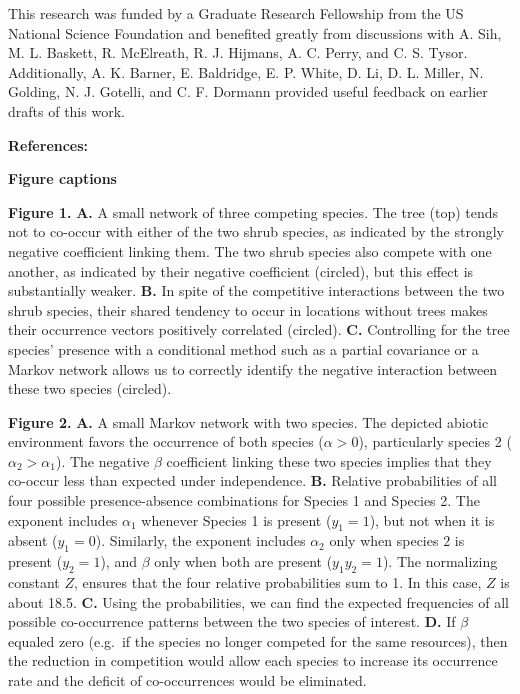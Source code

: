 \documentclass[12pt,]{article}
\begin{document}
\begin{spacing}{1.9}
\begin{flushleft}
This research was funded by a Graduate Research Fellowship from the US
National Science Foundation and benefited greatly from discussions with
A. Sih, M. L. Baskett, R. McElreath, R. J. Hijmans, A. C. Perry, and C.
S. Tysor. Additionally, A. K. Barner, E. Baldridge, E. P. White, D. Li,
D. L. Miller, N. Golding, N. J. Gotelli, and C. F. Dormann provided
useful feedback on earlier drafts of this work.

\setlength{\parindent}{0cm} \setlength{\parskip}{4pt}

\textbf{References:}

\textbf{Figure captions}

\textbf{Figure 1.} \textbf{A.} A small network of three competing
species. The tree (top) tends not to co-occur with either of the two
shrub species, as indicated by the strongly negative coefficient linking
them. The two shrub species also compete with one another, as indicated
by their negative coefficient (circled), but this effect is
substantially weaker. \textbf{B.} In spite of the competitive
interactions between the two shrub species, their shared tendency to
occur in locations without trees makes their occurrence vectors
positively correlated (circled). \textbf{C.} Controlling for the tree
species' presence with a conditional method such as a partial covariance
or a Markov network allows us to correctly identify the negative
interaction between these two species (circled).

\textbf{Figure 2.} \textbf{A.} A small Markov network with two species.
The depicted abiotic environment favors the occurrence of both species
(\(\alpha >0\)), particularly species 2 (\(\alpha_2 > \alpha_1\)). The
negative \(\beta\) coefficient linking these two species implies that
they co-occur less than expected under independence. \textbf{B.}
Relative probabilities of all four possible presence-absence
combinations for Species 1 and Species 2. The exponent includes
\(\alpha_1\) whenever Species 1 is present (\(y_1 = 1\)), but not when
it is absent (\(y_1 = 0\)). Similarly, the exponent includes
\(\alpha_2\) only when species \(2\) is present (\(y_2 = 1\)), and
\(\beta\) only when both are present (\(y_1y_2 = 1\)). The normalizing
constant \(Z\), ensures that the four relative probabilities sum to 1.
In this case, \(Z\) is about 18.5. \textbf{C.} Using the probabilities,
we can find the expected frequencies of all possible co-occurrence
patterns between the two species of interest. \textbf{D.} If \(\beta\)
equaled zero (e.g.~if the species no longer competed for the same
resources), then the reduction in competition would allow each species
to increase its occurrence rate and the deficit of co-occurrences would
be eliminated.


\end{flushleft}
\end{spacing}
\end{document}
